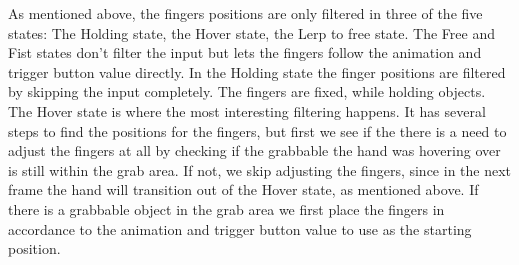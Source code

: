As mentioned above, the fingers positions are only filtered in three of the five states: The Holding state, the Hover state, the Lerp to free state. The Free and Fist states don't filter the input but lets the fingers follow the animation and trigger button value directly. In the Holding state the finger positions are filtered by skipping the input completely. The fingers are fixed, while holding objects. The Hover state is where the most interesting filtering happens. It has several steps to find the positions for the fingers, but first we see if the there is a need to adjust the fingers at all by checking if the grabbable the hand was hovering over is still within the grab area. If not, we skip adjusting the fingers, since in the next frame the hand will transition out of the Hover state, as mentioned above. If there is a grabbable object in the grab area we first place the fingers in accordance to the animation and trigger button value to use as the starting position.

